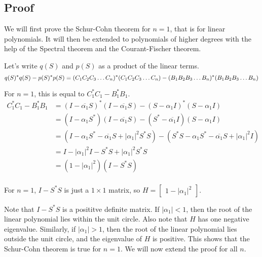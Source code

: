 \documentclass[twofold]{article}
\newcommand*\conj[1]{\overline{#1}}
\newcommand*\adj[1]{#1^*}
\newcommand*\abs[1]{\left \vert #1 \right\vert}
\theoremstyle{plain}
\theoremstyle{definition}
\theoremstyle{remark}
\begin{document}
\subsection{Proof}

We will first prove the Schur-Cohn theorem for \(n =1\), that is for linear polynomials. It will then be extended to polynomials of higher degrees with the help of the Spectral theorem and the Courant-Fischer theorem. 


Let's write \(q(S)\) and \(p(S)\) as a product of the linear terms. 
\[\adj{q(S)} q(S) - \adj{p(S)} p(S) \\= \adj{(C_1C_2C_3 \ldots C_n)}(C_1C_2C_3\ldots C_n) - \adj{(B_1B_2B_3\ldots B_n)} (B_1B_2B_3\ldots B_n)\]

For \(n =1\), this is equal to \(\adj{C_1} C_1 - \adj{B_1} B_1\). 
\begin{equation*}
\begin{split}
  \adj{C_1}C_1 - \adj{B_1} B_1  & = \adj{(I - \conj{\alpha_1}S)} (I - \conj{\alpha_1}S) - \adj{(S - \alpha_1 I)} (S - \alpha_1 I) \\
& = (I - \alpha_1\adj{S}) (I - \conj{\alpha_1}S) - (\adj{S} - \conj{\alpha_1} I) (S - \alpha_1 I) \\
 & = (I - \alpha_1\adj{S} - \conj{\alpha_1}S + \abs{\alpha_1}^2 \adj{S} S) - (\adj{S} S - \alpha_1 \adj{S} - \conj{\alpha_1} S + \abs{\alpha_1}^2I)\\
& = I - \abs{\alpha_1}^2 I - \adj{S} S + \abs{\alpha_1}^2 \adj{S} S \\
& = (1 - \abs{\alpha_1}^2) (I - \adj{S} S) \\
\end{split}
\end{equation*}

For \(n = 1\), \(I - \adj{S}S\) is just a \(1 \times 1\) matrix, so \(H = \begin{bmatrix} 1 - \abs{\alpha_1}^2 \end{bmatrix}\). 



Note that \(I - \adj{S} S\) is a posititve definite matrix. If \(\abs{\alpha_1} < 1\), then the root of the linear polynomial lies within the unit circle. Also note that \(H\) has one negative eigenvalue. Similarly, if \(\abs{\alpha_1} > 1\), then the root of the linear polynomial lies outside the unit circle, and the eigenvalue of \(H\) is positive. This shows that the Schur-Cohn theorem is true for \(n = 1\). We will now extend the proof for all \(n\). 
\end{document}

